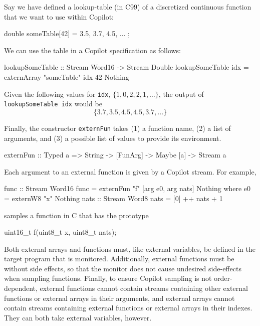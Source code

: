 %
\begin{example}
\label{exm:e}
Say we have defined a lookup-table (in C99) of a discretized continuous function that we want to use
within Copilot:
%
\begin{code}
double someTable[42] = { 3.5, 3.7, 4.5, ... };
\end{code}
%
We can use the table in a Copilot specification as follows:
%
\begin{code}
lookupSomeTable :: Stream Word16 -> Stream Double
lookupSomeTable idx = 
  externArray "someTable" idx 42 Nothing
\end{code}
%
Given the following values for \texttt{idx}, $\{1, 0, 2, 2, 1, \dots \}$, the output of 
\texttt{lookupSomeTable idx} would be $$\{3.7, 3.5, 4.5, 4.5, 3.7, \dots \}$$
\end{example}

Finally, the constructor \texttt{externFun} takes (1) a function name, (2) a
list of arguments, and (3) a possible list of values to provide its environment.
%
\begin{code}
externFun :: Typed a => String -> [FunArg] 
          -> Maybe [a] -> Stream a
\end{code}
%
Each argument to an external function is given by a Copilot stream.  For
example,
%
\begin{code}
func :: Stream Word16
func = externFun "f" [arg e0, arg nats] Nothing
  where
  e0 = externW8 "x" Nothing
  nats :: Stream Word8
  nats = [0] ++ nats + 1
\end{code} 
samples a function in C that has the prototype
%
\begin{code}
uint16_t f(uint8_t x, uint8_t nats);
\end{code}
% 

Both external arrays and functions must, like external variables, be defined
in the target program that is monitored. Additionally, external functions must be
without side effects, so that the monitor does not cause undesired side-effects when
sampling functions.  Finally, to ensure Copilot sampling is not
order-dependent, external functions cannot contain streams containing other
external functions or external arrays in their arguments, and external arrays
cannot contain streams containing external functions or external arrays in their
indexes.  They can both take external variables, however.

